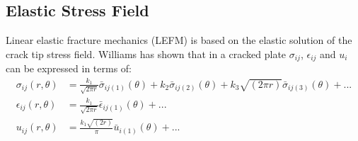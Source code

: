 \documentclass[11pt]{article}
\begin{document}
\subsection{Elastic Stress Field}Linear elastic fracture mechanics (LEFM) is based on the elastic solution of the crack tip stress field. Williams has shown that in a cracked plate 
$\sigma_{ij}$, $\epsilon_{ij}$ and $u_i$ can be expressed in terms of:
\begin{align*} 
    \sigma_{ij}(r, \theta) &= \frac{k_1}{\sqrt{2 \pi r}} \bar{\sigma}_{ij(1)}(\theta) + k_2 \bar{\sigma}_{ij(2)}(\theta) + k_3 \sqrt{(2 \pi r)}\bar{\sigma}_{ij(3)}(\theta) + ...
    \\\epsilon_{ij}(r, \theta) &= \frac{k_1}{\sqrt{2 \pi r}} \bar{\epsilon}_{ij(1)}(\theta) + ... \tag{1} \label{1}
    \\u_{ij}(r, \theta) &= \frac{k_1 \sqrt{(2 r)}}{\pi} \bar{u}_{i(1)}(\theta) + ...
\end{align*}
\begin{figure}[h]
    \begin{center}
    \end{center}
\end{figure}
\end{document}
